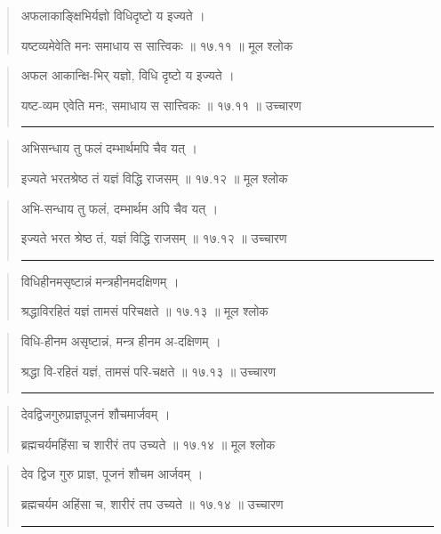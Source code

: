 \begin{quotation}

अफलाकाङ्क्षिभिर्यज्ञो विधिदृष्टो य इज्यते ।  

यष्टव्यमेवेति मनः समाधाय स सात्त्विकः  ॥ १७.११ ॥  मूल श्लोक
\end{quotation}

\begin{quotation}
अफल आकान्क्षि-भिर् यज्ञो, विधि दृष्टो य इज्यते ।  

यष्ट-व्यम एवेति मनः, समाधाय स सात्त्विकः  ॥ १७.११ ॥  उच्चारण

\noindent\rule{16cm}{0.4pt} 
\end{quotation}


\begin{quotation}

अभिसन्धाय तु फलं दम्भार्थमपि चैव यत्‌ ।  

इज्यते भरतश्रेष्ठ तं यज्ञं विद्धि राजसम्‌  ॥ १७.१२ ॥  मूल श्लोक
\end{quotation}

\begin{quotation}

अभि-सन्धाय तु फलं, दम्भार्थम अपि चैव यत्‌ ।  

इज्यते भरत श्रेष्ठ तं, यज्ञं विद्धि राजसम्‌  ॥ १७.१२ ॥  उच्चारण

\noindent\rule{16cm}{0.4pt} 
\end{quotation}


\begin{quotation}

विधिहीनमसृष्टान्नं मन्त्रहीनमदक्षिणम्‌ ।  

श्रद्धाविरहितं यज्ञं तामसं परिचक्षते  ॥ १७.१३ ॥  मूल श्लोक
\end{quotation}

\begin{quotation}

विधि-हीनम असृष्टान्नं, मन्त्र हीनम अ-दक्षिणम्‌ ।  

श्रद्धा वि-रहितं यज्ञं, तामसं परि-चक्षते  ॥ १७.१३ ॥  उच्चारण

\noindent\rule{16cm}{0.4pt} 
\end{quotation}


\begin{quotation}

देवद्विजगुरुप्राज्ञपूजनं शौचमार्जवम्‌ ।  

ब्रह्मचर्यमहिंसा च शारीरं तप उच्यते  ॥ १७.१४ ॥  मूल श्लोक
\end{quotation}

\begin{quotation}

देव द्विज गुरु प्राज्ञ, पूजनं शौचम आर्जवम्‌ ।  

ब्रह्मचर्यम अहिंसा च, शारीरं तप उच्यते  ॥ १७.१४ ॥  उच्चारण

\noindent\rule{16cm}{0.4pt} 
\end{quotation}


